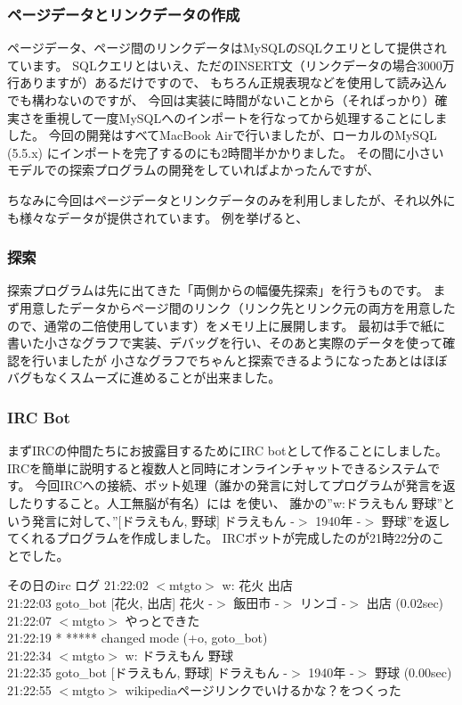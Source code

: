 \documentclass[b5paper]{jsarticle}
\begin{document}
\subsubsection{ページデータとリンクデータの作成}
ページデータ、ページ間のリンクデータはMySQLのSQLクエリとして提供されています。
SQLクエリとはいえ、ただのINSERT文（リンクデータの場合3000万行ありますが）あるだけですので、
もちろん正規表現などを使用して読み込んでも構わないのですが、
今回は実装に時間がないことから（そればっかり）確実さを重視して一度MySQLへのインポートを行なってから処理することにしました。
今回の開発はすべてMacBook Airで行いましたが、ローカルのMySQL (5.5.x) にインポートを完了するのにも2時間半かかりました。
その間に小さいモデルでの探索プログラムの開発をしていればよかったんですが、

ちなみに今回はページデータとリンクデータのみを利用しましたが、それ以外にも様々なデータが提供されています。
例を挙げると、

\subsubsection{探索}
探索プログラムは先に出てきた「両側からの幅優先探索」を行うものです。
まず用意したデータからページ間のリンク（リンク先とリンク元の両方を用意したので、通常の二倍使用しています）をメモリ上に展開します。
最初は手で紙に書いた小さなグラフで実装、デバッグを行い、そのあと実際のデータを使って確認を行いましたが
小さなグラフでちゃんと探索できるようになったあとはほぼバグもなくスムーズに進めることが出来ました。

\subsubsection{IRC Bot}
まずIRCの仲間たちにお披露目するためにIRC botとして作ることにしました。
IRCを簡単に説明すると複数人と同時にオンラインチャットできるシステムです。
今回IRCへの接続、ボット処理（誰かの発言に対してプログラムが発言を返したりすること。人工無脳が有名）には
を使い、
誰かの''w:ドラえもん 野球''という発言に対して、''$[$ドラえもん, 野球$]$ ドラえもん -$>$ 1940年 -$>$ 野球''を返してくれるプログラムを作成しました。
IRCボットが完成したのが21時22分のことでした。

\begin{itembox}{その日のirc ログ}
  21:22:02 $<$mtgto$>$ w: 花火 出店\\
  21:22:03 {goto\_bot} [花火, 出店] 花火 -$>$ 飯田市 -$>$ リンゴ -$>$ 出店 (0.02sec)\\
  21:22:07 $<$mtgto$>$ やっとできた\\
  21:22:19 * ***** changed mode (+o, goto\_bot)\\
  21:22:34 $<$mtgto$>$ w: ドラえもん 野球\\
  21:22:35 {goto\_bot} [ドラえもん, 野球] ドラえもん -$>$ 1940年 -$>$ 野球 (0.00sec)\\
  21:22:55 $<$mtgto$>$ wikipediaページリンクでいけるかな？をつくった
\end{itembox}
\end{document}
